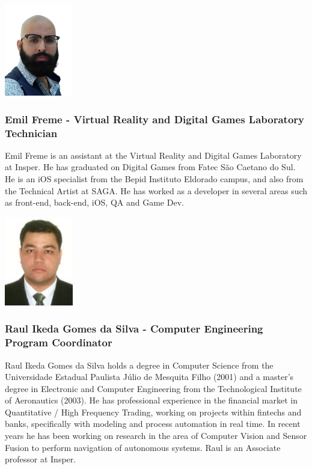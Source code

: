 \begin{multicols}{2}
\includegraphics[width=3cm]{imgs/emil-freme.png}
\columnbreak
\subsubsection{Emil Freme - Virtual Reality and Digital Games Laboratory Technician}
Emil Freme is an assistant at the Virtual Reality and Digital Games Laboratory at Insper. He has graduated on Digital Games from Fatec São Caetano do Sul. He is an iOS specialist from the Bepid Instituto Eldorado campus, and also from the Technical Artist at SAGA. He has worked as a developer in several areas such as front-end, back-end, iOS, QA and Game Dev.
\end{multicols}


\begin{multicols}{2}
\includegraphics[width=3cm]{imgs/Raul-Ikeda.jpg}
\columnbreak
\subsubsection{Raul Ikeda Gomes da Silva - Computer Engineering Program Coordinator}
Raul Ikeda Gomes da Silva holds a degree in Computer Science from the Universidade Estadual Paulista Júlio de Mesquita Filho (2001) and a master's degree in Electronic and Computer Engineering from the Technological Institute of Aeronautics (2003). He has professional experience in the financial market in Quantitative / High Frequency Trading, working on projects within fintechs and banks, specifically with modeling and process automation in real time. In recent years he has been working on research in the area of Computer Vision and Sensor Fusion to perform navigation of autonomous systems. Raul is an Associate professor at Insper.
\end{multicols}


